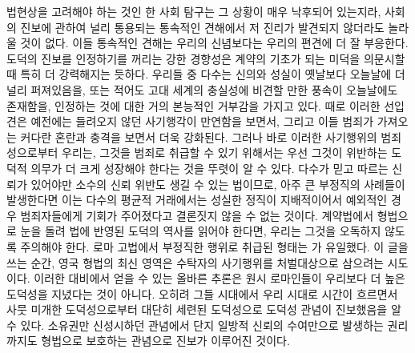 법현상을 고려해야 하는 것인 한
사회 탐구는 그 상황이 매우 낙후되어 있는지라,
사회의 진보에 관하여 널리 통용되는
통속적인 견해에서 저 진리가
발견되지 않더라도 놀라울 것이 없다.
이들 통속적인 견해는
우리의 신념보다는 우리의 편견에 더 잘 부응한다.
도덕의 진보를 인정하기를 꺼리는 강한 경향성은
계약의 기초가 되는 미덕을 의문시할 때
특히 더 강력해지는 듯하다.
우리들 중 다수는
신의와 성실이 옛날보다 오늘날에 더 널리 퍼져있음을,
또는 적어도 고대 세계의 충실성에 비견할 만한 풍속이 오늘날에도 존재함을,
인정하는 것에 대한
거의 본능적인 거부감을 가지고 있다.
때로 이러한 선입견은
예전에는 들려오지 않던
사기행각이 만연함을 보면서,
그리고 이들 범죄가 가져오는 커다란 혼란과 충격을 보면서
더욱 강화된다.
그러나 바로 이러한 사기행위의 범죄성으로부터 우리는,
그것을 범죄로 취급할 수 있기 위해서는
우선
그것이 위반하는 도덕적 의무가 더 크게 성장해야 한다는 것을
뚜렷이 알 수 있다.
다수가 믿고 따르는 신뢰가 있어야만
소수의 신뢰 위반도 생길 수 있는 법이므로,
아주 큰 부정직의 사례들이 발생한다면 이는
다수의 평균적 거래에서는 성실한 정직이 지배적이어서
예외적인 경우 범죄자들에게 기회가 주어졌다고
결론짓지 않을 수 없는 것이다.
계약법에서 형법으로 눈을 돌려
법에 반영된 도덕의 역사를 읽어야 한다면,
우리는 그것을 오독하지 않도록 주의해야 한다.
로마 고법에서 부정직한 행위로 취급된 형태는
가 유일했다.
이 글을 쓰는 순간,
영국 형법의 최신 영역은
수탁자의 사기행위를 처벌대상으로 삼으려는 시도이다.
이러한 대비에서 얻을 수 있는 올바른 추론은
원시 로마인들이 우리보다 더 높은 도덕성을 지녔다는 것이 아니다.
오히려 그들 시대에서 우리 시대로 시간이 흐르면서
사뭇 미개한 도덕성으로부터 대단히 세련된 도덕성으로
도덕성 관념이 진보했음을 알 수 있다.
소유권만 신성시하던 관념에서
단지 일방적 신뢰의 수여만으로 발생하는 권리까지도
형법으로 보호하는 관념으로 진보가 이루어진 것이다.

